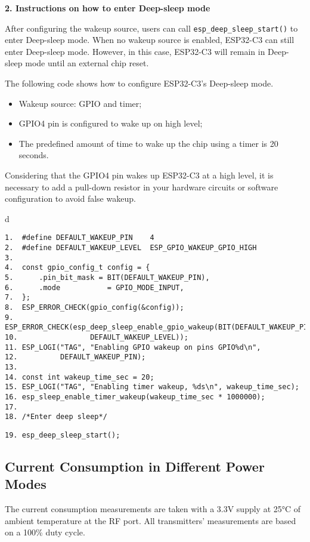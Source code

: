 \documentclass[a4paper,12pt]{book}
\begin{document}
\textbf{2. Instructions on how to enter Deep-sleep mode}

After configuring the wakeup source, users can call \verb|esp_deep_sleep_start()| to enter Deep-sleep mode. When no wakeup source is enabled, ESP32-C3 can still enter Deep-sleep mode. However, in this case, ESP32-C3 will remain in Deep-sleep mode until an external chip reset.

The following code shows how to configure ESP32-C3’s Deep-sleep mode.

\begin{itemize}
    \item Wakeup source: GPIO and timer;
    \item GPIO4 pin is configured to wake up on high level;
    \item The predefined amount of time to wake up the chip using a timer is 20 seconds. 
\end{itemize}

Considering that the GPIO4 pin wakes up ESP32-C3 at a high level, it is necessary to add a pull-down resistor in your hardware circuits or software configuration to avoid false wakeup.

\begin{codebloc}
\begin{tabular}{d}
\vspace{2pt}
\begin{verbatim}
1.  #define DEFAULT_WAKEUP_PIN    4
2.  #define DEFAULT_WAKEUP_LEVEL  ESP_GPIO_WAKEUP_GPIO_HIGH
3.  
4.  const gpio_config_t config = {
5.      .pin_bit_mask = BIT(DEFAULT_WAKEUP_PIN),
6.      .mode           = GPIO_MODE_INPUT,
7.  };
8.  ESP_ERROR_CHECK(gpio_config(&config));
9.  ESP_ERROR_CHECK(esp_deep_sleep_enable_gpio_wakeup(BIT(DEFAULT_WAKEUP_PIN),
10.                 DEFAULT_WAKEUP_LEVEL));
11. ESP_LOGI("TAG", "Enabling GPIO wakeup on pins GPIO%d\n",
12.          DEFAULT_WAKEUP_PIN);
13.
14. const int wakeup_time_sec = 20;
15. ESP_LOGI("TAG", "Enabling timer wakeup, %ds\n", wakeup_time_sec);
16. esp_sleep_enable_timer_wakeup(wakeup_time_sec * 1000000);
17.
18. /*Enter deep sleep*/
\end{verbatim}
\verb|19. esp_deep_sleep_start();|
\end{tabular}
\end{codebloc}

\subsection{Current Consumption in Different Power Modes}
The current consumption measurements are taken with a 3.3V supply at 25°C of ambient temperature at the RF port. All transmitters’ measurements are based on a 100\% duty cycle.
\end{document}

